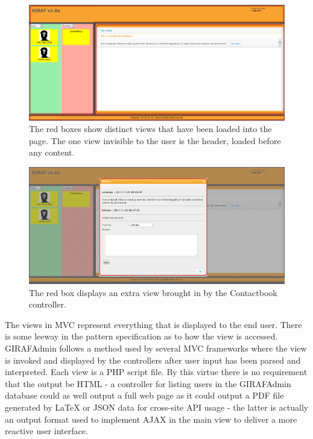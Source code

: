 \begin{figure}
    \begin{center}
    \includegraphics[scale=0.45,angle=90]{img/mvc_details/mvc_detailed_views}
    \caption{\label{implementation_view_views1}The red boxes show distinct views that have been loaded into the page. The one view invisible to the user is the header, loaded before any content.}
    \end{center}
\end{figure}

\begin{figure}
    \begin{center}
    \includegraphics[scale=0.45,angle=90]{img/mvc_details/mvc_detailed_views2_view}
    \caption{\label{implementation_view_views1}The red box displays an extra view brought in by the Contactbook controller.}
    \end{center}
\end{figure}

The views in MVC represent everything that is displayed to the end user. There is some leeway in the pattern specification as to how the view is accessed. GIRAFAdmin follows a method used by several MVC frameworks where the view is invoked and displayed by the controllers after user input has been parsed and interpreted. Each view is a PHP script file. By this virtue there is no requirement that the output be HTML - a controller for listing users in the GIRAFAdmin database could as well output a full web page as it could output a PDF file generated by LaTeX or JSON data for cross-site API usage - the latter is actually an output format used to implement AJAX in the main view to deliver a more reactive user interface.

